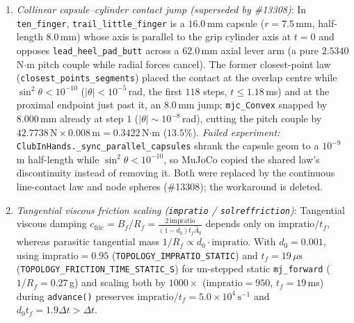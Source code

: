 \documentclass[11pt,a4paper]{article}
\begin{document}
\begin{enumerate}[leftmargin=*,noitemsep]
\item \textit{Collinear capsule--cylinder contact jump (superseded by \#13308)}: In \texttt{ten\_finger}, \texttt{trail\_little\_finger} is a $16.0$\,mm capsule ($r = 7.5$\,mm, half-length $8.0$\,mm) whose axis is parallel to the grip cylinder axis at $t = 0$ and opposes \texttt{lead\_heel\_pad\_butt} across a $62.0$\,mm axial lever arm (a pure $2.5340$\,N$\cdot$m pitch couple while radial forces cancel). The former closest-point law (\texttt{closest\_points\_segments}) placed the contact at the overlap centre while $\sin^2\theta < 10^{-10}$ ($|\theta| < 10^{-5}$\,rad, the first $118$ steps, $t \le 1.18$\,ms) and at the proximal endpoint just past it, an $8.0$\,mm jump; \texttt{mjc\_Convex} snapped by $8.000$\,mm already at step $1$ ($|\theta| \sim 10^{-8}$\,rad), cutting the pitch couple by $42.7738\,\mathrm{N} \times 0.008\,\mathrm{m} = 0.3422$\,N$\cdot$m ($13.5\%$). \emph{Failed experiment:} \texttt{ClubInHands.\_sync\_parallel\_capsules} shrank the capsule geom to a $10^{-9}$\,m half-length while $\sin^2\theta < 10^{-10}$, so MuJoCo copied the shared law's discontinuity instead of removing it. Both were replaced by the continuous line-contact law and node spheres (\#13308); the workaround is deleted.
\item \textit{Tangential viscous friction scaling (\texttt{impratio} / \texttt{solreffriction})}: Tangential viscous damping $c_{\mathrm{fric}} = B_f/R_f = \frac{2\,\mathrm{impratio}}{(1-d_0)t_f \hat{A}_0}$ depends only on $\mathrm{impratio}/t_f$, whereas parasitic tangential mass $1/R_f \propto d_0 \cdot \mathrm{impratio}$. With $d_0 = 0.001$, using $\mathrm{impratio} = 0.95$ (\texttt{TOPOLOGY\_IMPRATIO\_STATIC}) and $t_f = 19\,\mu\mathrm{s}$ (\texttt{TOPOLOGY\_FRICTION\_TIME\_STATIC\_S}) for un-stepped static \texttt{mj\_forward} ($1/R_f = 0.27$\,g) and scaling both by $1000\times$ ($\mathrm{impratio} = 950$, $t_f = 19$\,ms) during \texttt{advance()} preserves $\mathrm{impratio}/t_f = 5.0 \times 10^4\,\mathrm{s}^{-1}$ and $d_0 t_f = 1.9\Delta t > \Delta t$.
\end{enumerate}
\end{document}
